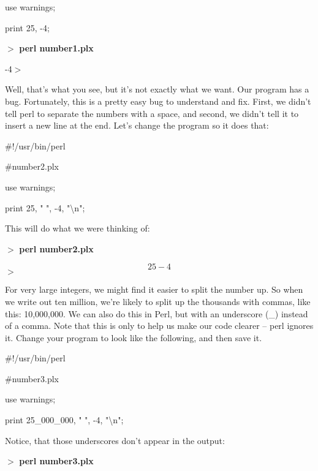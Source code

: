 \documentclass[a4paper,11pt]{book}
\begin{document}
\noindent use warnings;

\noindent print 25, -4;

\noindent 

\noindent $>$ \textbf{perl number1.plx}

-4$>$

\noindent 

\noindent Well, that's what you see, but it's not exactly what we want. Our program has a bug. Fortunately, this is a pretty easy bug to understand and fix. First, we didn't tell perl to separate the numbers with a space, and second, we didn't tell it to insert  a new line at the end. Let's change the program so it does that:

\noindent 

\noindent \#!/usr/bin/perl

\noindent \#number2.plx

\noindent use warnings;

\noindent print 25, " ", -4, "\textbackslash n";

\noindent 

\noindent This will do what we were thinking of:

\noindent 

\noindent $>$ \textbf{perl number2.plx}

\[25 -4\] 
$>$

\noindent 

\noindent For very large integers, we might find it easier to split the number up. So when we write out ten million, we're likely to split up the thousands with commas, like this: 10,000,000. We can also do this in Perl, but with an underscore (\_) instead of a comma. Note that this is only to help us make our code clearer -- perl ignores it. Change your program to look like the following, and then save it.

\noindent 

\noindent \#!/usr/bin/perl

\noindent \#number3.plx

\noindent use warnings;

\noindent print 25\_000\_000, " ", -4, "\textbackslash n";

\noindent 

\noindent 

\noindent Notice, that those underscores don't appear in the output:

\noindent 

\noindent $>$ \textbf{perl number3.plx}
\end{document}

